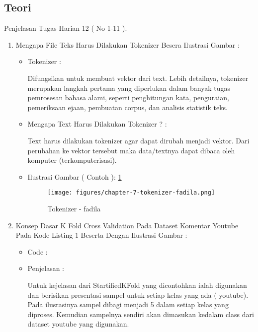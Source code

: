 \subsection{Teori}
Penjelasan Tugas Harian 12 ( No 1-11 ).
\begin{enumerate}
\item Mengapa File Teks Harus Dilakukan Tokenizer Besera Ilustrasi Gambar :
\begin{itemize}
\item Tokenizer :
\par Difungsikan untuk membuat vektor dari text. Lebih detailnya, tokenizer merupakan langkah pertama yang diperlukan dalam banyak tugas pemrosesan bahasa alami, seperti penghitungan kata, penguraian, pemeriksaan ejaan, pembuatan corpus, dan analisis statistik teks.
\par
\par
\item Mengapa Text Harus Dilakukan Tokenizer ? :
\par Text harus dilakukan tokenizer agar dapat dirubah menjadi vektor. Dari perubahan ke vektor tersebut maka data/textnya dapat dibaca oleh komputer (terkomputerisasi).
\par
\par
\item Ilustrasi Gambar ( Contoh ): \ref{chapter-7-tokenizer-fadila}
\par
\begin{figure}[!hbtp]
\centering
\texttt{[image: figures/chapter-7-tokenizer-fadila.png]}
\caption{Tokenizer - fadila}
\label{chapter-7-tokenizer-fadila}
\end{figure}
\par
\end{itemize}
\par
\par
\item Konsep Dasar K Fold Cross Validation Pada Dataset Komentar Youtube Pada Kode Listing 1 Beserta Dengan Ilustrasi Gambar :
\begin{itemize}
\item Code		:

\item Penjelasan	: 
\par Untuk kejelasan dari StartifiedKFold yang dicontohkan ialah digunakan dan berisikan presentasi sampel untuk setiap kelas yang ada ( youtube). Pada ilusrasinya sampel dibagi menjadi 5 dalam setiap kelas yang diproses. Kemudian sampelnya sendiri akan dimasukan kedalam class dari dataset youtube yang digunakan.

\end{itemize}
\end{enumerate}

